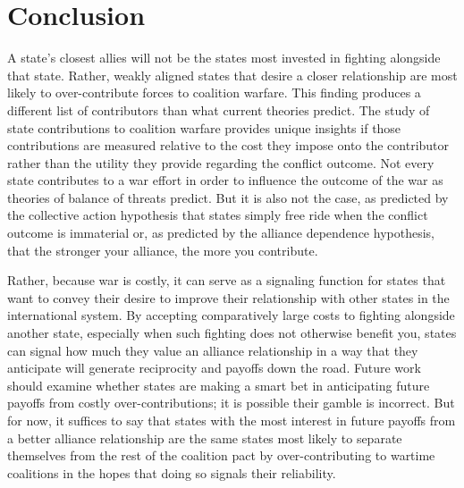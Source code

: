 \documentclass[12pt,letterpaper]{article}
\begin{document}
\section{Conclusion}
	A state's closest allies will not be the states most invested in fighting alongside that state. Rather, weakly aligned states that desire a closer relationship are most likely to over-contribute forces to coalition warfare. This finding produces a different list of contributors than what current theories predict. The study of state contributions to coalition warfare provides unique insights if those contributions are measured relative to the cost they impose onto the contributor rather than the utility they provide regarding the conflict outcome. Not every state contributes to a war effort in order to influence the outcome of the war as theories of balance of threats predict. But it is also not the case, as predicted by the collective action hypothesis that states simply free ride when the conflict outcome is immaterial or, as predicted by the alliance dependence hypothesis, that the stronger your alliance, the more you contribute.

	Rather, because war is costly, it can serve as a signaling function for states that want to convey their desire to improve their relationship with other states in the international system. By accepting comparatively large costs to fighting alongside another state, especially when such fighting does not otherwise benefit you, states can signal how much they value an alliance relationship in a way that they anticipate will generate reciprocity and payoffs down the road. Future work should examine whether states are making a smart bet in anticipating future payoffs from costly over-contributions; it is possible their gamble is incorrect. But for now, it suffices to say that states with the most interest in future payoffs from a better alliance relationship are the same states most likely to separate themselves from the rest of the coalition pact by over-contributing to wartime coalitions in the hopes that doing so signals their reliability.

\newpage

\theendnotes

\newpage



\end{document}
